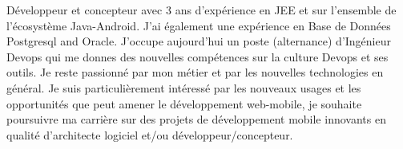 %
%
%
\par{
Développeur et concepteur avec 3 ans d'expérience en JEE et sur l'ensemble de l'écosystème Java-Android. J'ai également une expérience en Base de Données Postgresql and Oracle. J'occupe aujourd'hui un poste (alternance) d'Ingénieur Devops qui me donnes des nouvelles compétences sur la culture Devops et ses outils. Je reste passionné par mon métier et par les nouvelles technologies en général. Je suis particulièrement intéressé par les nouveaux usages et les opportunités que peut amener le développement web-mobile, je souhaite poursuivre ma carrière sur des projets de développement mobile innovants en qualité d'architecte logiciel et/ou développeur/concepteur.
}
